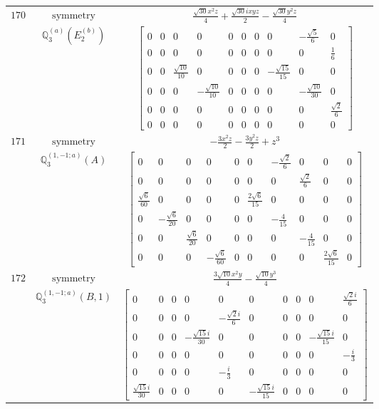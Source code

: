 \documentclass[fleqn,8pt,landscape]{jsarticle}
\begin{document}
\begin{longtable}{ccc}
$ 170 $ & $ \text{symmetry} $ & $ \frac{\sqrt{30} x^{2} z}{4} + \frac{\sqrt{30} i x y z}{2} - \frac{\sqrt{30} y^{2} z}{4} $ \\
$  $ & $ \mathbb{Q}_{3}^{(a)}(E_{2}^{(b)}) $ & $ \begin{bmatrix} 0 & 0 & 0 & 0 & 0 & 0 & 0 & 0 & - \frac{\sqrt{5}}{6} & 0 \\ 0 & 0 & 0 & 0 & 0 & 0 & 0 & 0 & 0 & \frac{1}{6} \\ 0 & 0 & \frac{\sqrt{10}}{10} & 0 & 0 & 0 & 0 & - \frac{\sqrt{15}}{15} & 0 & 0 \\ 0 & 0 & 0 & - \frac{\sqrt{10}}{10} & 0 & 0 & 0 & 0 & - \frac{\sqrt{10}}{30} & 0 \\ 0 & 0 & 0 & 0 & 0 & 0 & 0 & 0 & 0 & \frac{\sqrt{2}}{6} \\ 0 & 0 & 0 & 0 & 0 & 0 & 0 & 0 & 0 & 0 \end{bmatrix} $ \\ \hline
$ 171 $ & $ \text{symmetry} $ & $ - \frac{3 x^{2} z}{2} - \frac{3 y^{2} z}{2} + z^{3} $ \\
$  $ & $ \mathbb{Q}_{3}^{(1,-1;a)}(A) $ & $ \begin{bmatrix} 0 & 0 & 0 & 0 & 0 & 0 & - \frac{\sqrt{2}}{6} & 0 & 0 & 0 \\ 0 & 0 & 0 & 0 & 0 & 0 & 0 & \frac{\sqrt{2}}{6} & 0 & 0 \\ \frac{\sqrt{6}}{60} & 0 & 0 & 0 & 0 & \frac{2 \sqrt{6}}{15} & 0 & 0 & 0 & 0 \\ 0 & - \frac{\sqrt{6}}{20} & 0 & 0 & 0 & 0 & - \frac{4}{15} & 0 & 0 & 0 \\ 0 & 0 & \frac{\sqrt{6}}{20} & 0 & 0 & 0 & 0 & - \frac{4}{15} & 0 & 0 \\ 0 & 0 & 0 & - \frac{\sqrt{6}}{60} & 0 & 0 & 0 & 0 & \frac{2 \sqrt{6}}{15} & 0 \end{bmatrix} $ \\ \hline
$ 172 $ & $ \text{symmetry} $ & $ \frac{3 \sqrt{10} x^{2} y}{4} - \frac{\sqrt{10} y^{3}}{4} $ \\
$  $ & $ \mathbb{Q}_{3}^{(1,-1;a)}(B,1) $ & $ \begin{bmatrix} 0 & 0 & 0 & 0 & 0 & 0 & 0 & 0 & 0 & \frac{\sqrt{2} i}{6} \\ 0 & 0 & 0 & 0 & - \frac{\sqrt{2} i}{6} & 0 & 0 & 0 & 0 & 0 \\ 0 & 0 & 0 & - \frac{\sqrt{15} i}{30} & 0 & 0 & 0 & 0 & - \frac{\sqrt{15} i}{15} & 0 \\ 0 & 0 & 0 & 0 & 0 & 0 & 0 & 0 & 0 & - \frac{i}{3} \\ 0 & 0 & 0 & 0 & - \frac{i}{3} & 0 & 0 & 0 & 0 & 0 \\ \frac{\sqrt{15} i}{30} & 0 & 0 & 0 & 0 & - \frac{\sqrt{15} i}{15} & 0 & 0 & 0 & 0 \end{bmatrix} $ \\ \hline

\end{longtable}
\end{document}
